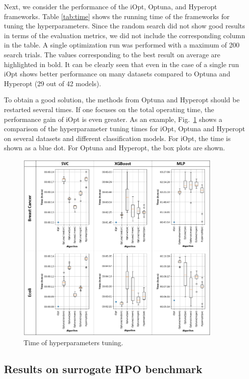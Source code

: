 \documentclass[iicol]{sn-jnl}
\theoremstyle{thmstyleone}%
\theoremstyle{thmstyletwo}%
\theoremstyle{thmstylethree}%
\begin{document}
Next, we consider the performance of the iOpt, Optuna, and Hyperopt frameworks. Table \ref{tab:time} shows the running time of the frameworks for tuning the hyperparameters.
Since the random search did not show good results in terms of the evaluation metrics, we did not include the corresponding column in the table. 
A single optimization run was performed with a maximum of 200 search trials. The values corresponding to the best result on average are highlighted in bold. It can be clearly seen that even in the case of a single run iOpt shows better performance on many datasets compared to Optuna and Hyperopt (29 out of 42 models).

To obtain a good solution, the methods from Optuna and Hyperopt should be restarted several times. If one focuses on the total operating time, the performance gain of iOpt is even greater. As an example, Fig.~\ref{fig8} shows a comparison of the hyperparameter tuning times for iOpt, Optuna and Hyperopt on several datasets and different classification models. For iOpt, the time is shown as a blue dot. For Optuna and Hyperopt, the box plots are shown.

\begin{figure}
\centering
\includegraphics[width=0.9\textwidth]{fig_time}
\caption{Time of hyperparameters tuning.} \label{fig8}
\end{figure}

\subsection{Results on surrogate HPO benchmark}
\end{document}
